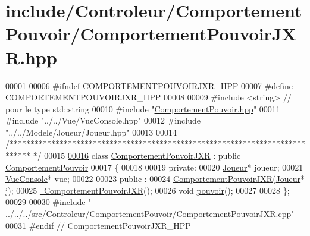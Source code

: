 \hypertarget{_comportement_pouvoir_j_x_r_8hpp_source}{\section{include/\-Controleur/\-Comportement\-Pouvoir/\-Comportement\-Pouvoir\-J\-X\-R.hpp}
}

\begin{DoxyCode}
00001 
00006 \textcolor{preprocessor}{#ifndef COMPORTEMENTPOUVOIRJXR\_HPP}
00007 \textcolor{preprocessor}{}\textcolor{preprocessor}{#define COMPORTEMENTPOUVOIRJXR\_HPP}
00008 \textcolor{preprocessor}{}
00009 \textcolor{preprocessor}{#include <string>} \textcolor{comment}{// pour le type std::string}
00010 \textcolor{preprocessor}{#include "\hyperlink{_comportement_pouvoir_8hpp}{ComportementPouvoir.hpp}"}
00011 \textcolor{preprocessor}{#include "../../Vue/VueConsole.hpp"}
00012 \textcolor{preprocessor}{#include "../../Modele/Joueur/Joueur.hpp"}
00013 
00014 \textcolor{comment}{/*****************************************************************************
      */}
00015 
\hypertarget{_comportement_pouvoir_j_x_r_8hpp_source_l00016}{}\hyperlink{class_comportement_pouvoir_j_x_r}{00016} \textcolor{keyword}{class }\hyperlink{class_comportement_pouvoir_j_x_r}{ComportementPouvoirJXR} : \textcolor{keyword}{public} \hyperlink{class_comportement_pouvoir}{ComportementPouvoir}
00017 \{
00018 
00019    \textcolor{keyword}{private}:
00020     \hyperlink{class_joueur}{Joueur}* joueur;
00021     \hyperlink{class_vue_console}{VueConsole}* vue;
00022 
00023    \textcolor{keyword}{public} :
00024       \hyperlink{class_comportement_pouvoir_j_x_r_a6bfa37111b1d6add5cabd1c5a433291b}{ComportementPouvoirJXR}(\hyperlink{class_joueur}{Joueur}* j);
00025       \hyperlink{class_comportement_pouvoir_j_x_r_a60e6ba18e25818261a5c11bd6780db10}{~ComportementPouvoirJXR}();
00026       \textcolor{keywordtype}{void} \hyperlink{class_comportement_pouvoir_j_x_r_a3d40cb49543bd69accaa1ddfb09aa9cc}{pouvoir}();
00027     
00028 \};
00029 
00030 \textcolor{preprocessor}{#include "
      ../../../src/Controleur/ComportementPouvoir/ComportementPouvoirJXR.cpp"}
00031 \textcolor{preprocessor}{#endif // ComportementPouvoirJXR\_HPP}
\end{DoxyCode}

